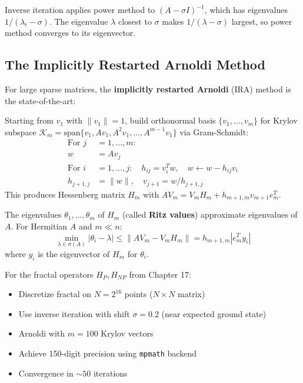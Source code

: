 \begin{remark}
Inverse iteration applies power method to $(A - \sigma I)^{-1}$, which has eigenvalues $1/(\lambda_i - \sigma)$. The eigenvalue $\lambda$ closest to $\sigma$ makes $1/(\lambda - \sigma)$ largest, so power method converges to its eigenvector.
\end{remark}

\subsection{The Implicitly Restarted Arnoldi Method}

For large sparse matrices, the \textbf{implicitly restarted Arnoldi} (IRA) method is the state-of-the-art:

\begin{defn}\label{def:arnoldi}
Starting from $v_1$ with $\|v_1\| = 1$, build orthonormal basis $\{v_1, \ldots, v_m\}$ for Krylov subspace $\mathcal{K}_m = \text{span}\{v_1, Av_1, A^2v_1, \ldots, A^{m-1}v_1\}$ via Gram-Schmidt:
\begin{align}
\text{For } j &= 1, \ldots, m: \\
w &= A v_j \\
\text{For } i &= 1, \ldots, j: \quad h_{ij} = v_i^T w, \quad w \leftarrow w - h_{ij} v_i \\
h_{j+1,j} &= \|w\|, \quad v_{j+1} = w/h_{j+1,j}
\end{align}
This produces Hessenberg matrix $H_m$ with $A V_m = V_m H_m + h_{m+1,m} v_{m+1} e_m^T$.
\end{defn}

\begin{thm}\label{thm:ritz}
The eigenvalues $\theta_1, \ldots, \theta_m$ of $H_m$ (called \textbf{Ritz values}) approximate eigenvalues of $A$. For Hermitian $A$ and $m \ll n$:
\begin{equation}
\min_{\lambda \in \sigma(A)} |\theta_i - \lambda| \leq \|A V_m - V_m H_m\| = h_{m+1,m} |e_m^T y_i|
\end{equation}
where $y_i$ is the eigenvector of $H_m$ for $\theta_i$.
\end{thm}

\begin{remark}
For the fractal operators $H_P, H_{NP}$ from Chapter 17:
\begin{itemize}
\item Discretize fractal on $N = 2^{16}$ points ($N \times N$ matrix)
\item Use inverse iteration with shift $\sigma = 0.2$ (near expected ground state)
\item Arnoldi with $m = 100$ Krylov vectors
\item Achieve 150-digit precision using \texttt{mpmath} backend
\item Convergence in $\sim 50$ iterations
\end{itemize}
\end{remark}

